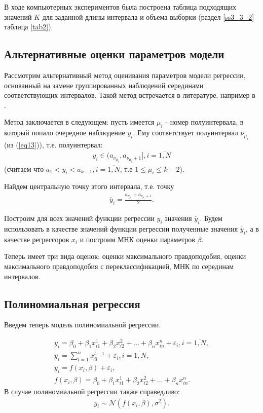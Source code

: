В ходе компьютерных экспериментов была построена таблица подходящих значений $K$ для заданной длины интервала и объема выборки (раздел \ref{ss3_3_2} таблица \ref{tab2}).

\newpage
\subsection{Альтернативные оценки параметров модели}
Рассмотрим альтернативный метод оценивания параметров модели регрессии, основанный на замене группированных наблюдений серединами соответствующих интервалов. 
Такой метод встречается в литературе, например в \cite{interval_valued}.

Метод заключается в следующем:
пусть имеется $\mu_i$ - номер полуинтервала, в который попало очередное наблюдение $y_i$. Ему соответствует полуинтервал $\nu_{\mu_i}$ (из (\ref{eq13})), т.е. полуинтервал:
\begin{eqnarray}
    y_i\in (a_{\nu_{\mu_i}},a_{\nu_{\mu_i}+1}], i = \overline{1,N}
\end{eqnarray}
(считаем что $a_1<y_i<a_{k-1}, i=\overline{1,N}$, т.е $1\leq\mu_i\leq k-2$).

Найдем центральную точку этого интервала, т.е. точку
\begin{eqnarray}
    \check{y_i} = \frac{a_{\nu_{\mu_i}} + a_{\nu_{\mu_i}+1}}{2}.
\end{eqnarray}

Построим для всех значений функции регрессии $y_i$ значения $\check{y_i}$.
Будем использовать в качестве значений функции регрессии полученные значения $\check{y_i}$, а в качестве регрессоров $x_i$ и построим МНК оценки параметров $\beta$.

Теперь имеет три вида оценок: оценки максимального правдоподобия, оценки максимального правдоподобия с переклассификацией, МНК по серединам интервалов. 
\newpage
\subsection{Полиномиальная регрессия}
Введем теперь модель полиномиальной регрессии.

\begin{equation}
    \begin{array}{c}
        \label{eq28}y_i=\beta_0+\beta_1 x_{i1}^1+\beta_2 x_{i2}^2+\dots+\beta_n x_{in}^n+\varepsilon_i, i=\overline{1,N},\\
        y_i = \sum\limits_{l=1}^{n} x_{il}^{l-1} + \varepsilon_i, i=\overline{1,N},\\
        y_i= f(x_i,\beta)+\varepsilon_i,\\
        f(x_i,\beta)=\beta_0+\beta_1 x_{i1}^1+\beta_2 x_{i2}^2+\dots+\beta_n x_{in}^n.
    \end{array}
\end{equation}
В случае полиномиальной регрессии также справедливо:
\begin{eqnarray}
    y_i\sim \mathcal{N}(f(x_i,\beta),\sigma^2).
\end{eqnarray}


